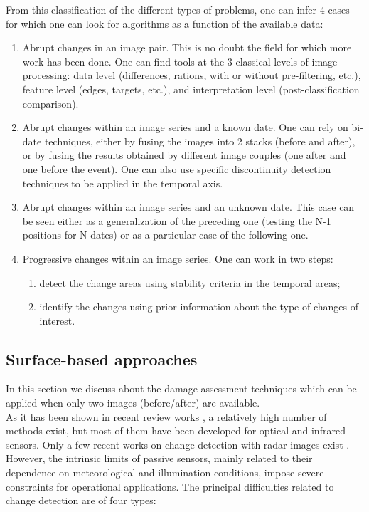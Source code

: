 From this classification of the different types of problems, one can
infer 4 cases for which one can look for algorithms as a function of
the available data:
\begin{enumerate}
\item Abrupt changes in an image pair. This is no doubt the field for
  which more work has been done. One can find tools at the 3 classical
  levels of image processing: data level (differences, rations, with
  or without pre-filtering, etc.), feature level (edges, targets,
  etc.), and interpretation level (post-classification comparison).

\item Abrupt changes within an image series and a known date. One can
  rely on bi-date techniques, either by fusing the images into 2 stacks
  (before and after), or by fusing the results obtained by different
  image couples (one after and one before the event). One can also use
  specific discontinuity detection techniques to be applied in the
  temporal axis.

\item Abrupt changes within an image series and an unknown date. This
  case can be seen either as a generalization of the preceding one (testing
  the N-1 positions for N dates) or as a particular case of the
  following one.

\item Progressive changes within an image series. One can work in two
  steps:
  \begin{enumerate}
    \item detect the change areas using stability criteria in the
    temporal areas;
    \item identify the changes using prior information about the type
    of changes of interest.
  \end{enumerate}
  
\end{enumerate}




\subsection{Surface-based approaches}\label{secChgtAbr}
In this section we discuss about the damage assessment techniques
which can be applied when only two images (before/after) are available.\\

As it has been shown in recent review works
\cite{Coppin03,Lu04,Radke05,Richards05}, a relatively high number of
methods exist, but most of them have been developed for optical and
infrared sensors. Only a few recent works on change detection with
radar images exist
\cite{Stabel02,Bruzzone02b,Onana_2003,Inglada03,Derrode03,Bazi05}.
However, the intrinsic limits of passive sensors, mainly related to
their dependence on meteorological and illumination conditions, impose
severe constraints for operational applications. The principal
difficulties related to change detection are of four types:

